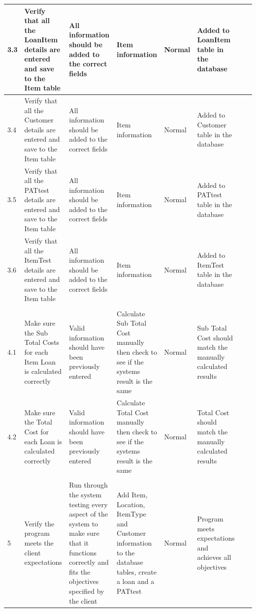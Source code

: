 \begin{landscape}
\begin{center}
\begin{longtable}{|p{1.5cm}|p{2cm}|p{3cm}|p{2cm}|p{2cm}|p{2.5cm}|p{2cm}|p{2cm}|}
        3.3 & Verify that all the LoanItem details are entered and save to the Item table & All information should be added to the correct fields & Item information & 
              Normal & Added to LoanItem table in the database & & \\ \hline
        
        3.4 & Verify that all the Customer details are entered and save to the Item table & All information should be added to the correct fields & Item information & 
              Normal & Added to Customer table in the database & & \\ \hline
        
        3.5 & Verify that all the PATtest details are entered and save to the Item table & All information should be added to the correct fields & Item information & 
              Normal & Added to PATtest table in the database & & \\ \hline
        
        3.6 & Verify that all the ItemTest details are entered and save to the Item table & All information should be added to the correct fields & Item information & 
              Normal & Added to ItemTest table in the database & & \\ \hline
        
        & & & & & & & \\ \hline

        4.1 & Make sure the Sub Total Costs for each Item Loan is calculated correctly & Valid information should have been previously entered & Calculate Sub Total 
        Cost manually then check to see if the systems result is the same & Normal & Sub Total Cost should match the manually calculated results & & \\ \hline
        
        4.2 & Make sure the Total Cost for each Loan is calculated correctly & Valid information should have been previously entered & Calculate Total 
        Cost manually then check to see if the systems result is the same & Normal & Total Cost should match the manually calculated results & & \\ \hline
        
        & & & & & & & \\ \hline

        5   & Verify the program meets the client expectations & Run through the system testing every aspect of the system to make sure that it functions correctly and 
        fits the objectives specified by the client & Add Item, Location, ItemType and Customer information to the database tables, create a loan and a PATtest & 
        Normal & Program meets expectations and achieves all objectives & & \\ \hline
    \end{longtable}
\end{center}
\end{landscape}

